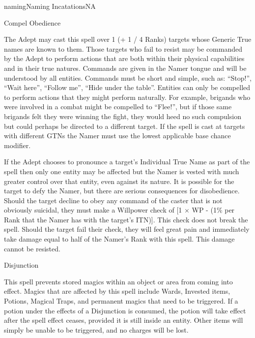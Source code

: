 \begin{College}[2.0]{naming}{Naming Incatations}{NA}
\begin{spell}[S-3]{Compel Obedience}

\begin{effects}
The Adept may cast this spell over 1 (+ 1 / 4 Ranks) targets whose
Generic True names are known to them.  Those targets who fail to
resist may be commanded by the Adept to perform actions that are
both within their physical capabilities and in their true natures.
Commands are given in the Namer tongue and will be understood by all
entities. Commands must be short and simple, such as: “Stop!”, “Wait
here”, “Follow me”, “Hide under the table”. Entities can only be
compelled to perform actions that they might perform naturally.  For
example, brigands who were involved in a combat might be compelled to
“Flee!”, but if those same brigands felt they were winning the fight,
they would heed no such compulsion but could perhaps be directed to a
different target. If the spell is cast at targets with different GTNs
the Namer must use the lowest applicable base chance modifier.

If the Adept chooses to pronounce a target’s Individual True Name as
part of the spell then only one entity may be affected but the Namer
is vested with much greater control over that entity, even against its
nature.  It is possible for the target to defy the Namer, but there
are serious consequences for disobedience. Should the target decline
to obey any command of the caster that is not obviously suicidal, they
must make a Willpower check of [1 × WP - (1\% per Rank that the Namer
  has with the target’s ITN)]. This check does not break the spell.
Should the target fail their check, they will feel great pain and
immediately take damage equal to half of the Namer’s Rank with this
spell. This damage cannot be resisted.
\end{effects}
\end{spell}

\begin{spell}[S-4]{Disjunction}

\begin{effects}
This spell prevents stored magics within an object or area from coming
into effect. Magics that are affected by this spell include Wards,
Invested items, Potions, Magical Traps, and permanent magics that need
to be triggered.  If a potion under the effects of a Disjunction is
consumed, the potion will take effect after the spell effect ceases,
provided it is still inside an entity.  Other items will simply be
unable to be triggered, and no charges will be lost.
\end{effects}
\end{spell}


\end{College}
